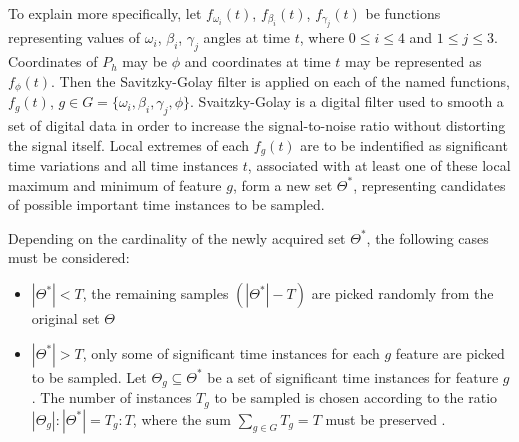 To explain more specifically, let $f_{\omega_i}(t)$, $f_{\beta_i}(t)$, $f_{\gamma_j}(t)$ be functions representing values of $\omega_i$, $\beta_i$, $\gamma_j$ angles at time $t$, where $0 \leq i \leq 4$ and $1 \leq j \leq 3$. Coordinates of $P_h$ may be $\phi$ and coordinates at time $t$ may be represented as $f_{\phi}(t)$. Then the Savitzky-Golay filter \cite{savitzkty} is applied on each of the named functions, $f_g(t)$, $g \in G = \{\omega_i,\beta_i, \gamma_j, \phi\}$. Svaitzky-Golay is a digital filter used to smooth a set of digital data in order to increase the signal-to-noise ratio without distorting the signal itself. Local extremes of each $f_g(t)$ are to be indentified as significant time variations and all time instances $t$, associated with at least one of these local maximum and minimum of feature $g$, form a new set $\Theta^*$, representing candidates of possible important time instances to be sampled. 


Depending on the cardinality of the newly acquired set $\Theta^*$, the following cases must be considered:

\begin{itemize}
	\item $|\Theta^*| < T$, the remaining samples $(|\Theta^*|-T)$ are picked randomly from the original set $\Theta$
	\item $|\Theta^*| > T$, only some of significant time instances for each $g$ feature are picked to be sampled. Let $\Theta_g \subseteq \Theta^*$ be a set of significant time instances for feature $g$. The number of instances $T_g$ to be sampled is chosen according to the ratio $|\Theta_g|:|\Theta^*| = T_g:T$, where the sum $\sum_{g \in G}{T_g} = T$ must be preserved \cite{avola}.
\end{itemize}


